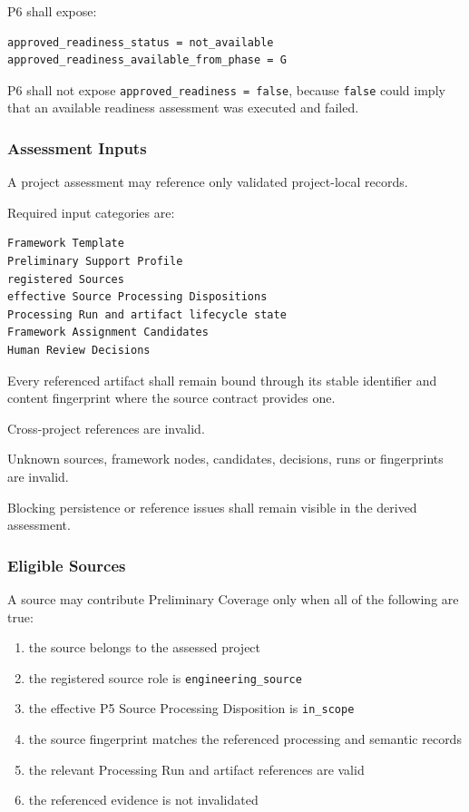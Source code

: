P6 shall expose:

\begin{verbatim}
approved_readiness_status = not_available
approved_readiness_available_from_phase = G
\end{verbatim}

P6 shall not expose \texttt{approved\_readiness\ =\ false}, because \texttt{false} could imply that an available readiness assessment was executed and failed.

\hypertarget{assessment-inputs}{%
\subsubsection{Assessment Inputs}\label{assessment-inputs}}

A project assessment may reference only validated project-local records.

Required input categories are:

\begin{verbatim}
Framework Template
Preliminary Support Profile
registered Sources
effective Source Processing Dispositions
Processing Run and artifact lifecycle state
Framework Assignment Candidates
Human Review Decisions
\end{verbatim}

Every referenced artifact shall remain bound through its stable identifier and content fingerprint where the source contract provides one.

Cross-project references are invalid.

Unknown sources, framework nodes, candidates, decisions, runs or fingerprints are invalid.

Blocking persistence or reference issues shall remain visible in the derived assessment.

\hypertarget{eligible-sources}{%
\subsubsection{Eligible Sources}\label{eligible-sources}}

A source may contribute Preliminary Coverage only when all of the following are true:

\begin{enumerate}
\def\labelenumi{\arabic{enumi}.}
\tightlist
\item
  the source belongs to the assessed project
\item
  the registered source role is \texttt{engineering\_source}
\item
  the effective P5 Source Processing Disposition is \texttt{in\_scope}
\item
  the source fingerprint matches the referenced processing and semantic records
\item
  the relevant Processing Run and artifact references are valid
\item
  the referenced evidence is not invalidated
\end{enumerate}

